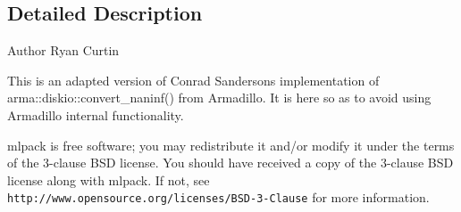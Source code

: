 \subsection{Detailed Description}
\begin{DoxyAuthor}{Author}
Ryan Curtin
\end{DoxyAuthor}
This is an adapted version of Conrad Sanderson\textquotesingle{}s implementation of arma\+::diskio\+::convert\+\_\+naninf() from Armadillo. It is here so as to avoid using Armadillo internal functionality.

mlpack is free software; you may redistribute it and/or modify it under the terms of the 3-\/clause B\+SD license. You should have received a copy of the 3-\/clause B\+SD license along with mlpack. If not, see {\tt http\+://www.\+opensource.\+org/licenses/\+B\+S\+D-\/3-\/\+Clause} for more information. 